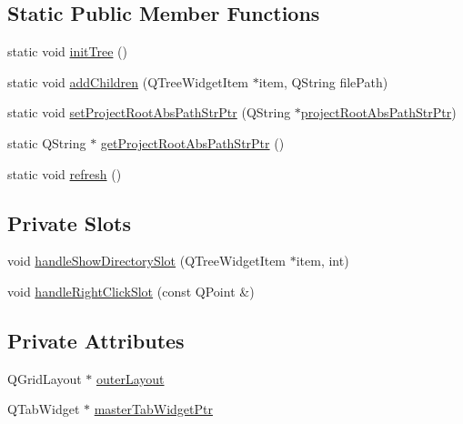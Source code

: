 \subsection*{Static Public Member Functions}
\begin{DoxyCompactItemize}
\item 
static void \hyperlink{class_file_tree_gui_a5d4df4a19da0183ccc254019f77097b1}{init\-Tree} ()
\item 
static void \hyperlink{class_file_tree_gui_ab3c2fd5311245c08624461ac4c7e120c}{add\-Children} (Q\-Tree\-Widget\-Item $\ast$item, Q\-String file\-Path)
\item 
static void \hyperlink{class_file_tree_gui_afe882583424429fcda9c4c2bc0ab71d4}{set\-Project\-Root\-Abs\-Path\-Str\-Ptr} (Q\-String $\ast$\hyperlink{class_file_tree_gui_a9ce991f8f95f583aa5fb1bec7a9bcd4c}{project\-Root\-Abs\-Path\-Str\-Ptr})
\item 
static Q\-String $\ast$ \hyperlink{class_file_tree_gui_a21607e8cda6732997d5148581017a9b8}{get\-Project\-Root\-Abs\-Path\-Str\-Ptr} ()
\item 
static void \hyperlink{class_file_tree_gui_ac2c3399b5cb85da5cd1c119b61c674c0}{refresh} ()
\end{DoxyCompactItemize}
\subsection*{Private Slots}
\begin{DoxyCompactItemize}
\item 
void \hyperlink{class_file_tree_gui_aa8110a99d6bab64818b7f87024382b2a}{handle\-Show\-Directory\-Slot} (Q\-Tree\-Widget\-Item $\ast$item, int)
\item 
void \hyperlink{class_file_tree_gui_a9d726b5258284de8f9dc10cddddbdc87}{handle\-Right\-Click\-Slot} (const Q\-Point \&)
\end{DoxyCompactItemize}
\subsection*{Private Attributes}
\begin{DoxyCompactItemize}
\item 
Q\-Grid\-Layout $\ast$ \hyperlink{class_file_tree_gui_aaf8b63a4775b1d46d635cdaef94b979a}{outer\-Layout}
\item 
Q\-Tab\-Widget $\ast$ \hyperlink{class_file_tree_gui_adb1e3ecfaab582317fcd9b968bbf6c40}{master\-Tab\-Widget\-Ptr}
\end{DoxyCompactItemize}
